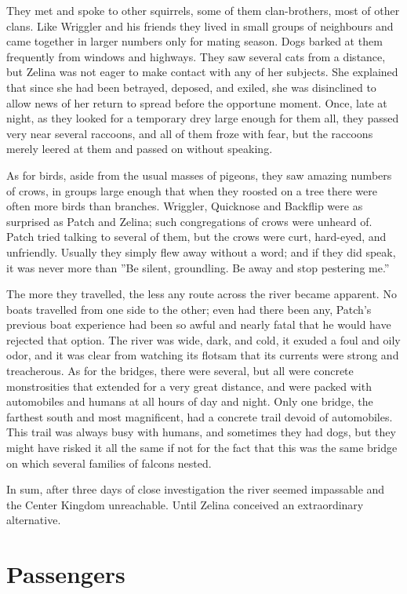 \documentclass[12pt]{book}
\begin{document}
They met and spoke to other squirrels, some of them clan-brothers, most of other clans. Like Wriggler and his friends they lived in small groups of neighbours and came together in larger numbers only for mating season. Dogs barked at them frequently from windows and highways. They saw several cats from a distance, but Zelina was not eager to make contact with any of her subjects. She explained that since she had been betrayed, deposed, and exiled, she was disinclined to allow news of her return to spread before the opportune moment. Once, late at night, as they looked for a temporary drey large enough for them all, they passed very near several raccoons, and all of them froze with fear, but the raccoons merely leered at them and passed on without speaking.

As for birds, aside from the usual masses of pigeons, they saw amazing numbers of crows, in groups large enough that when they roosted on a tree there were often more birds than branches. Wriggler, Quicknose and Backflip were as surprised as Patch and Zelina; such congregations of crows were unheard of. Patch tried talking to several of them, but the crows were curt, hard-eyed, and unfriendly. Usually they simply flew away without a word; and if they did speak, it was never more than ''Be silent, groundling. Be away and stop pestering me.''

The more they travelled, the less any route across the river became apparent. No boats travelled from one side to the other; even had there been any, Patch's previous boat experience had been so awful and nearly fatal that he would have rejected that option. The river was wide, dark, and cold, it exuded a foul and oily odor, and it was clear from watching its flotsam that its currents were strong and treacherous. As for the bridges, there were several, but all were concrete monstrosities that extended for a very great distance, and were packed with automobiles and humans at all hours of day and night. Only one bridge, the farthest south and most magnificent, had a concrete trail devoid of automobiles. This trail was always busy with humans, and sometimes they had dogs, but they might have risked it all the same %
if not for the fact that this was the same bridge on which several families of falcons nested.

In sum, after three days of close investigation the river seemed impassable and the Center Kingdom unreachable. Until Zelina conceived an extraordinary alternative.


\section{Passengers}
\end{document}
